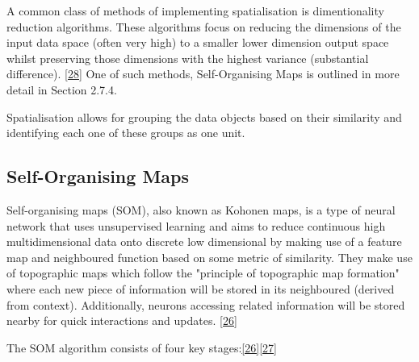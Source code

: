 A common class of methods of implementing spatialisation is dimentionality reduction algorithms. These algorithms focus on reducing the dimensions of the input data space (often very high) to a smaller lower dimension output space whilst preserving those dimensions with the highest variance (substantial difference). \hyperlink{28}{[28]} One of such methods, Self-Organising Maps is outlined in more detail in Section 2.7.4. 

Spatialisation allows for grouping the data objects based on their similarity and identifying each one of these groups as one unit.

\subsection{Self-Organising Maps}

Self-organising maps (SOM), also known as Kohonen maps, is a type of neural network that uses unsupervised learning and aims to reduce continuous high multidimensional data onto discrete low dimensional by making use of a feature map and neighboured function based on some metric of similarity. They make use of topographic maps which follow the "principle of topographic map formation" where each new piece of information will be stored in its neighboured (derived from context). Additionally, neurons accessing related information will be stored nearby for quick interactions and updates. \hyperlink{26}{[26]} 

The SOM algorithm consists of four key stages:\hyperlink{26}{[26]}\hyperlink{27}{[27]}

